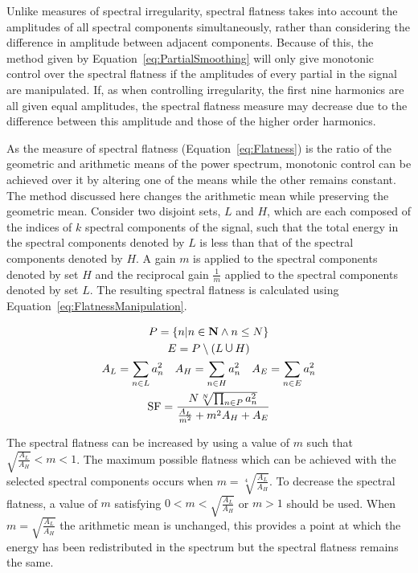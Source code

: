 		Unlike measures of spectral irregularity, spectral flatness takes into account the amplitudes of all
		spectral components simultaneously, rather than considering the difference in amplitude between adjacent
		components. Because of this, the method given by Equation~\ref{eq:PartialSmoothing} will only give
		monotonic control over the spectral flatness if the amplitudes of every partial in the signal are
		manipulated. If, as when controlling irregularity, the first nine harmonics are all given equal amplitudes,
		the spectral flatness measure may decrease due to the difference between this amplitude and those of the
		higher order harmonics.

		As the measure of spectral flatness (Equation~\ref{eq:Flatness}) is the ratio of the geometric and
		arithmetic means of the power spectrum, monotonic control can be achieved over it by altering one of the
		means while the other remains constant. The method discussed here changes the arithmetic mean while
		preserving the geometric mean. Consider two disjoint sets, $L$ and $H$, which are each composed of the
		indices of $k$ spectral components of the signal, such that the total energy in the spectral components
		denoted by $L$ is less than that of the spectral components denoted by $H$. A gain $m$ is applied to the
		spectral components denoted by set $H$ and the reciprocal gain $\frac{1}{m}$ applied to the spectral
		components denoted by set $L$. The resulting spectral flatness is calculated using
		Equation~\ref{eq:FlatnessManipulation}.

		\begin{gather}
			P = \left\{ n | n \in \textbf{N} \land n \leq N \right\} \nonumber \\
			E = P \setminus (L \medcup H) \nonumber \\
			A_{L} = \sum_{n \in L} a_{n}^{2} \quad A_{H} = \sum_{n \in H} a_{n}^{2}
			   \quad A_{E} = \sum_{n \in E} a_{n}^{2} \nonumber \\
			\mathrm{SF} = \frac{N\sqrt[N]{\prod_{n \in P} a_{n}^{2}}}
					   {\frac{A_{L}}{m^{2}} + m^{2}A_{H} + A_{E}}
			\label{eq:FlatnessManipulation}
		\end{gather}

		The spectral flatness can be increased by using a value of $m$ such that $\sqrt{\frac{A_{L}}{A_{H}}} < m <
		1$. The maximum possible flatness which can be achieved with the selected spectral components occurs when
		$m = \sqrt[4]{\frac{A_{L}}{A_{H}}}$. To decrease the spectral flatness, a value of $m$ satisfying $0 < m <
		\sqrt{\frac{A_{L}}{A_{H}}}$ or $m > 1$ should be used. When $m = \sqrt{\frac{A_{L}}{A_{H}}}$ the arithmetic
		mean is unchanged, this provides a point at which the energy has been redistributed in the spectrum but the
		spectral flatness remains the same. 

